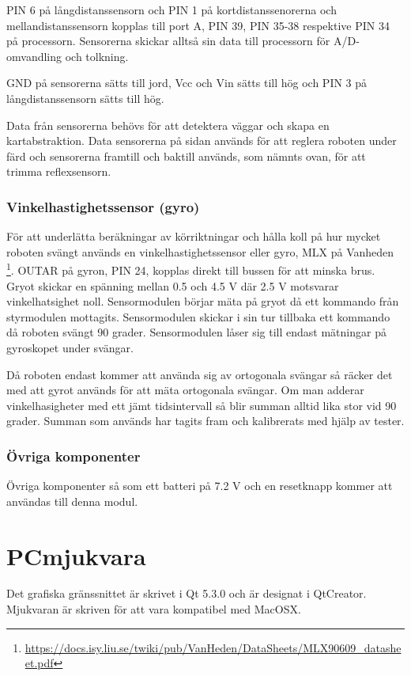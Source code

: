 \documentclass[a4paper,12pt,fleqn]{article}
\begin{document}
PIN 6 på långdistanssensorn och PIN 1 på kortdistanssenorerna och mellandistanssensorn kopplas till port A, PIN 39, PIN 35-38 respektive PIN 34 på processorn. Sensorerna skickar alltså sin data till processorn för A/D-omvandling och tolkning.

GND på sensorerna sätts till jord, Vcc och Vin sätts till hög och PIN 3 på långdistanssensorn sätts till hög.
 
Data från sensorerna behövs för att detektera väggar och skapa en kartabstraktion. Data sensorerna på sidan används för att reglera roboten under färd och sensorerna framtill och baktill används, som nämnts ovan, för att trimma reflexsensorn.

\subsubsection{Vinkelhastighetssensor (gyro)}
För att underlätta beräkningar av körriktningar och hålla koll på hur mycket roboten svängt används en vinkelhastighetssensor eller gyro, MLX på Vanheden \footnote{\url{https://docs.isy.liu.se/twiki/pub/VanHeden/DataSheets/MLX90609\_datasheet.pdf}}. OUTAR på gyron, PIN 24, kopplas direkt till bussen för att minska brus. Gryot skickar en spänning mellan 0.5 och 4.5 V där 2.5 V motsvarar vinkelhatsighet noll. Sensormodulen börjar mäta på gryot då ett kommando från styrmodulen mottagits. Sensormodulen skickar i sin tur tillbaka ett kommando då roboten svängt 90 grader. Sensormodulen låser sig till endast mätningar på gyroskopet under svängar.

Då roboten endast kommer att använda sig av ortogonala svängar så räcker det med att gyrot används för att mäta ortogonala svängar. Om man adderar vinkelhasigheter med ett jämt tidsintervall så blir summan alltid lika stor vid 90 grader.
Summan som används har tagits fram och kalibrerats med hjälp av tester.

\subsubsection{Övriga komponenter}
Övriga komponenter så som ett batteri på 7.2 V och en resetknapp kommer att användas till denna modul.

\section{PCmjukvara}
Det grafiska gränssnittet är skrivet i Qt 5.3.0 och är designat i QtCreator. Mjukvaran är skriven för att vara kompatibel med MacOSX.
\end{document}
